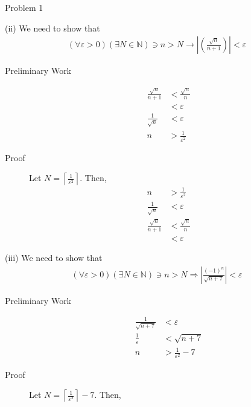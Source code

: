 \documentclass[10pt]{extarticle}
\newcommand{\N}{\mathbb{N}}
\begin{document}
\begin{problem}{Problem 1}
    \begin{problem}{(ii)}
      We need to show that
      \begin{align*}
        (\forall \varepsilon > 0)(\exists N\in \N) \ni n > N \rightarrow \left|\left(\frac{\sqrt{n}}{n + 1}\right)\right| < \varepsilon
      \end{align*}
      \begin{description}
        \item[Preliminary Work]
          \begin{align*}
            \frac{\sqrt{n}}{n+1}&<\frac{\sqrt{n}}{n} \\
                                &< \varepsilon\\
            \frac{1}{\sqrt{n}} &< \varepsilon\\
            n &> \frac{1}{\varepsilon^2}
          \end{align*}
        \item[Proof] Let $\displaystyle N = \left\lceil\frac{1}{\varepsilon^2}\right\rceil$. Then,
          \begin{align*}
            n &> \frac{1}{\varepsilon^2}\\
            \frac{1}{\sqrt{n}} &< \varepsilon\\
            \frac{\sqrt{n}}{n+1} &< \frac{\sqrt{n}}{n}\\
                                 &< \varepsilon
          \end{align*}
      \end{description}
    \end{problem}
    \begin{problem}{(iii)}
      We need to show that
      \begin{align*}
        (\forall \varepsilon > 0)(\exists N \in \N) \ni n > N \Rightarrow \left|\frac{(-1)^n}{\sqrt{n+7}}\right| < \varepsilon
      \end{align*}
      \begin{description}
        \item[Preliminary Work]
          \begin{align*}
            \frac{1}{\sqrt{n+7}} &< \varepsilon\\
            \frac{1}{\varepsilon} & < \sqrt{n+7}\\
            n &> \frac{1}{\varepsilon^2} - 7 
          \end{align*}
        \item[Proof] Let $\displaystyle N =  \left\lceil\frac{1}{\varepsilon^2}\right\rceil-7$. Then,

\end{description}
\end{problem}
\end{problem}
\end{document}
